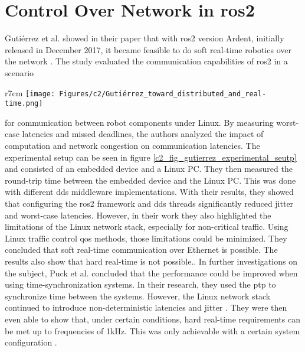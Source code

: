 \section{Control Over Network in \gls{ros2}}\label{c2_sec_control_over_network}
Gutiérrez et al. showed in their paper that with \gls{ros2} version Ardent, initially released in December 2017, it became feasible to do soft real-time robotics over the network \cite{gutierrez_towards_2018}. The study evaluated the communication capabilities of \gls{ros2} in a scenario
\begin{wrapfigure}{r}{7cm}
\texttt{[image: Figures/c2/Gutiérrez\_toward\_distributed\_and\_real-time.png]}
\caption{The experimental setup used by Gutiérrez et al. to evaluate the real-time performance of \gls{ros2} communication over Ethernet. Figure taken from \cite{gutierrez_towards_2018}.} \label{c2_fig_gutierrez_experimental_seutp}
\end{wrapfigure}
for communication between robot components under Linux. By measuring worst-case latencies and missed deadlines, the authors analyzed the impact of computation and network congestion on communication latencies. The experimental setup can be seen in figure \ref{c2_fig_gutierrez_experimental_seutp} and consisted of an embedded device and a Linux PC. They then measured the round-trip time between the embedded device and the Linux PC. This was done with different \gls{dds} middleware implementations. With their results, they showed that configuring the \gls{ros2} framework and \gls{dds}  threads significantly reduced jitter and worst-case latencies. However, in their work they also highlighted the limitations of the Linux network stack, especially for non-critical traffic. Using Linux traffic control \gls{qos} methods, those limitations could be minimized. They concluded that soft real-time communication over Ethernet is possible. The results also show that hard real-time is not possible.\cite{gutierrez_towards_2018}. \newline
In further investigations on the subject, Puck et al. concluded  that the performance could be improved when using time-synchronization systems. In their research, they used the \gls{ptp} to synchronize time between the systems. However, the Linux network stack continued to introduce non-deterministic latencies and jitter \cite{puck_distributed_2020}. They were then even able to show that, under certain conditions, hard real-time requirements can be met up to frequencies of 1kHz. This was only achievable with a certain system configuration \cite{puck_performance_2021}.\newline
